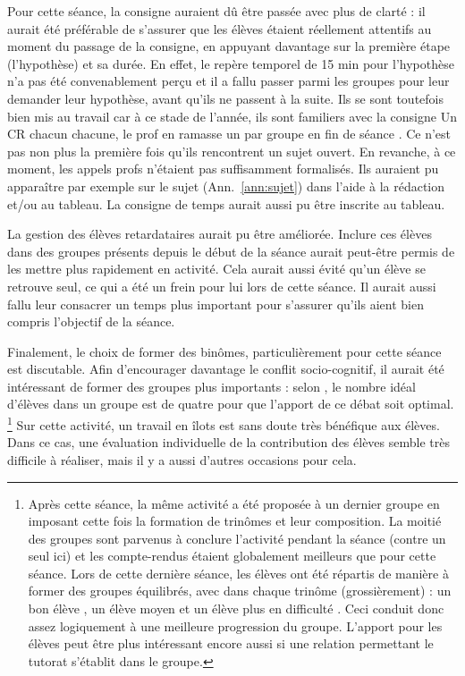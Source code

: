 \documentclass[12pt,a4paper, fleqn]{report}
\begin{document}
Pour cette séance, la consigne auraient dû être passée avec plus de clarté : il aurait été préférable de s'assurer que les élèves étaient réellement attentifs au moment du passage de la consigne, en appuyant davantage sur la première étape (l'hypothèse) et sa durée.
En effet, le repère temporel de 15 min pour l'hypothèse n'a pas été convenablement perçu et il a fallu passer parmi les groupes pour leur demander leur hypothèse, avant qu'ils ne passent à la suite.
Ils se sont toutefois bien mis au travail car à ce stade de l'année, ils sont familiers avec la consigne \og Un CR chacun chacune, le prof en ramasse un par groupe en fin de séance \fg{}.
Ce n'est pas non plus la première fois qu'ils rencontrent un sujet ouvert.
En revanche, à ce moment, les appels profs n'étaient pas suffisamment formalisés.
Ils auraient pu apparaître par exemple sur le sujet (Ann.~\ref{ann:sujet}) dans l'aide à la rédaction et/ou au tableau.
La consigne de temps aurait aussi pu être inscrite au tableau.

La gestion des élèves retardataires aurait pu être améliorée.
Inclure ces élèves dans des groupes présents depuis le début de la séance aurait peut-être permis de les mettre plus rapidement en activité.
Cela aurait aussi évité qu'un élève se retrouve seul, ce qui a été un frein pour lui lors de cette séance.
Il aurait aussi fallu leur consacrer un temps plus important pour s'assurer qu'ils aient bien compris l'objectif de la séance.

Finalement, le choix de former des binômes, particulièrement pour cette séance est discutable.
Afin d'encourager davantage le conflit socio-cognitif, il aurait été intéressant de former des groupes plus importants : selon \cite{Courtillot2006}, le nombre idéal d'élèves dans un groupe est de quatre pour que l'apport de ce débat soit optimal.
\footnote{Après cette séance, la même activité a été proposée à un dernier groupe en imposant cette fois la formation de trinômes et leur composition.
La moitié des groupes sont parvenus à conclure l'activité pendant la séance (contre un seul ici) et les compte-rendus étaient globalement meilleurs que pour cette séance.
Lors de cette dernière séance, les élèves ont été répartis de manière à former des groupes équilibrés, avec dans chaque trinôme (grossièrement) : un \og bon élève \fg{}, un \og élève moyen \fg{} et un \og élève plus en difficulté \fg{}.
Ceci conduit donc assez logiquement à une meilleure progression du groupe.
L'apport pour les élèves peut être plus intéressant encore aussi si une relation permettant le tutorat s'établit dans le groupe.}
Sur cette activité, un travail en îlots est sans doute très bénéfique aux élèves.
Dans ce cas, une évaluation individuelle de la contribution des élèves semble très difficile à réaliser, mais il y a aussi d'autres occasions pour cela.
\end{document}
